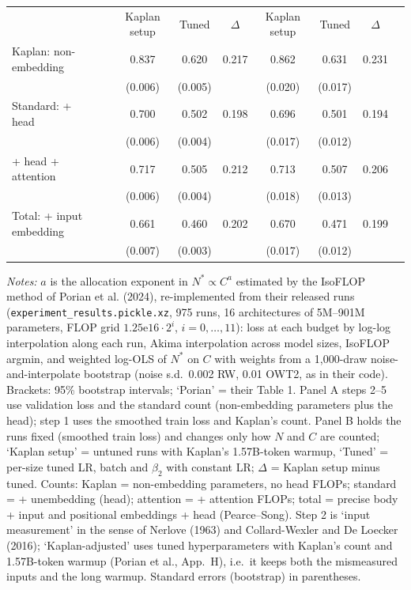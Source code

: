 \begin{table}[htbp]
\begin{threeparttable}
\begin{tabular}{llccccccc}
 & & Kaplan setup & Tuned & $\Delta$ & Kaplan setup & Tuned & $\Delta$ &  \\
Kaplan: non-embedding & & 0.837 & 0.620 & 0.217 & 0.862 & 0.631 & 0.231 &  \\
 & & (0.006) & (0.005) & & (0.020) & (0.017) & &  \\
Standard: + head & & 0.700 & 0.502 & 0.198 & 0.696 & 0.501 & 0.194 &  \\
 & & (0.006) & (0.004) & & (0.017) & (0.012) & &  \\
+ head + attention & & 0.717 & 0.505 & 0.212 & 0.713 & 0.507 & 0.206 &  \\
 & & (0.006) & (0.004) & & (0.018) & (0.013) & &  \\
Total: + input embedding & & 0.661 & 0.460 & 0.202 & 0.670 & 0.471 & 0.199 &  \\
 & & (0.007) & (0.003) & & (0.017) & (0.012) & &  \\
\bottomrule
\end{tabular}
\begin{tablenotes}[flushleft]
\footnotesize
\item \textit{Notes:} $a$ is the allocation exponent in $N^*\propto C^{a}$ estimated by the IsoFLOP method of Porian et al. (2024), re-implemented from their released runs (\texttt{experiment\_results.pickle.xz}, 975 runs, 16 architectures of 5M--901M parameters, FLOP grid $1.25\mathrm{e}16\cdot 2^i$, $i=0,\dots,11$): loss at each budget by log-log interpolation along each run, Akima interpolation across model sizes, IsoFLOP argmin, and weighted log-OLS of $N^*$ on $C$ with weights from a 1,000-draw noise-and-interpolate bootstrap (noise s.d.\ 0.002 RW, 0.01 OWT2, as in their code). Brackets: 95\% bootstrap intervals; `Porian' = their Table 1. Panel A steps 2--5 use validation loss and the standard count (non-embedding parameters plus the head); step 1 uses the smoothed train loss and Kaplan's count. Panel B holds the runs fixed (smoothed train loss) and changes only how $N$ and $C$ are counted; `Kaplan setup' = untuned runs with Kaplan's 1.57B-token warmup, `Tuned' = per-size tuned LR, batch and $\beta_2$ with constant LR; $\Delta$ = Kaplan setup minus tuned. Counts: Kaplan = non-embedding parameters, no head FLOPs; standard = + unembedding (head); attention = + attention FLOPs; total = precise body + input and positional embeddings + head (Pearce--Song). Step 2 is `input measurement' in the sense of Nerlove (1963) and Collard-Wexler and De Loecker (2016); `Kaplan-adjusted' uses tuned hyperparameters with Kaplan's count and 1.57B-token warmup (Porian et al., App.~H), i.e.\ it keeps both the mismeasured inputs and the long warmup. Standard errors (bootstrap) in parentheses.
\end{tablenotes}
\end{threeparttable}
\end{table}
